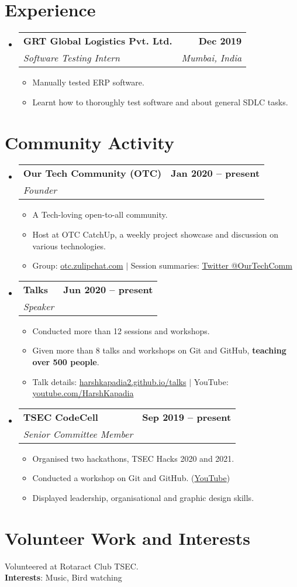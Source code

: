 \documentclass[letterpaper,11pt]{article}
\makeatletter
\newcommand{\resumeItem}[1]{
  \item\small{
    {#1 \vspace{-2pt}}
  }
}
\newcommand{\resumeSubheading}[4]{
  \vspace{-2pt}\item
    \begin{tabular*}{1.0\textwidth}[t]{l@{\extracolsep{\fill}}r}
      \textbf{#1} & \textbf{\small #2} \\
      \textit{\small#3} & \textit{\small #4} \\
    \end{tabular*}\vspace{-7pt}
}
\newcommand{\resumeSubHeadingListStart}{\begin{itemize}[leftmargin=0.0in, label={}]}
\newcommand{\resumeSubHeadingListEnd}{\end{itemize}}
\newcommand{\resumeItemListStart}{\begin{itemize}}
\newcommand{\resumeItemListEnd}{\end{itemize}\vspace{-5pt}}
\makeatother
\begin{document}
\section{Experience}
    \resumeSubHeadingListStart
        \resumeSubheading
            {GRT Global Logistics Pvt. Ltd.}{Dec 2019}
            {Software Testing Intern}{Mumbai, India}
            \resumeItemListStart
                \resumeItem{Manually tested ERP software.}
                \resumeItem{Learnt how to thoroughly test software and about general SDLC tasks.}
            \resumeItemListEnd
    \resumeSubHeadingListEnd
\vspace{-16pt}


\section{Community Activity}
    \resumeSubHeadingListStart
        \resumeSubheading
            {Our Tech Community (OTC)}{Jan 2020 -- present}
            {Founder}{}
            \resumeItemListStart
                \resumeItem{A Tech-loving open-to-all community.}
                \resumeItem{Host at OTC CatchUp, a weekly project showcase and discussion on various technologies.}
                \resumeItem{Group: \href{https://otc.zulipchat.com/}{otc.zulipchat.com} $|$ Session summaries: \href{https://twitter.com/OurTechComm}{Twitter @OurTechComm}}
            \resumeItemListEnd
    
        \resumeSubheading
            {Talks}{Jun 2020 -- present}
            {Speaker}{}
            \resumeItemListStart
                \resumeItem{Conducted more than 12 sessions and workshops.}
                \resumeItem{Given more than 8 talks and workshops on Git and GitHub, \textbf{teaching over 500 people}.}
                \resumeItem{Talk details: \href{https://harshkapadia2.github.io/talks/}{harshkapadia2.github.io/talks} $|$ YouTube: \href{https://www.youtube.com/HarshKapadia}{youtube.com/HarshKapadia}}
            \resumeItemListEnd

        \resumeSubheading
            {TSEC CodeCell}{Sep 2019 -- present}
            {Senior Committee Member}{}
            \resumeItemListStart
                \resumeItem{Organised two hackathons, TSEC Hacks 2020 and 2021.}
                \resumeItem{Conducted a workshop on Git and GitHub. (\href{https://www.youtube.com/watch?v=ArOKEf8nkfw}{YouTube})}
                \resumeItem{Displayed leadership, organisational and graphic design skills.}
            \resumeItemListEnd
    \resumeSubHeadingListEnd
\vspace{-16pt}


\section{Volunteer Work and Interests}
    \begin{itemize}[leftmargin=0.2in, label={}]
    {\item{
        Volunteered at Rotaract Club TSEC. \\
        \textbf{Interests}: Music, Bird watching
    }}
    \end{itemize}
\end{document}
